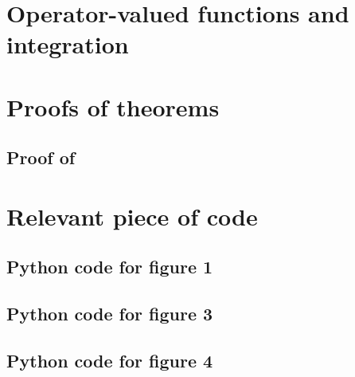 
\chapter{Operator-valued functions and integration}
\label{ch:operator-valued_functions_and_integration}

\chapter{Proofs of theorems}
\label{ch:proof_of_theorems}
\section{Proof of }

\chapter{Relevant piece of code}
\label{ch:proof_of_theorems}
\section{Python code for figure 1}
{\scriptsize
{}}

\section{Python code for figure 3}
{\scriptsize
{}}

\section{Python code for figure 4}
{\scriptsize
{}}

